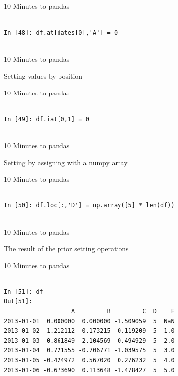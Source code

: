 \documentclass{beamer}
\begin{document}
\begin{frame}[t,fragile]{10 Minutes to pandas}


	\scriptsize
\begin{verbatim}

In [48]: df.at[dates[0],'A'] = 0


\end{verbatim}


\end{frame}


\begin{frame}[t]{10 Minutes to pandas}

Setting values by position

\end{frame}


\begin{frame}[t,fragile]{10 Minutes to pandas}


	\scriptsize
\begin{verbatim}

In [49]: df.iat[0,1] = 0


\end{verbatim}


\end{frame}


\begin{frame}[t]{10 Minutes to pandas}

Setting by assigning with a numpy array

\end{frame}


\begin{frame}[t,fragile]{10 Minutes to pandas}


	\scriptsize
\begin{verbatim}

In [50]: df.loc[:,'D'] = np.array([5] * len(df))


\end{verbatim}


\end{frame}


\begin{frame}[t]{10 Minutes to pandas}

The result of the prior setting operations

\end{frame}


\begin{frame}[t,fragile]{10 Minutes to pandas}


	\scriptsize
\begin{verbatim}

In [51]: df
Out[51]: 
                   A         B         C  D    F
2013-01-01  0.000000  0.000000 -1.509059  5  NaN
2013-01-02  1.212112 -0.173215  0.119209  5  1.0
2013-01-03 -0.861849 -2.104569 -0.494929  5  2.0
2013-01-04  0.721555 -0.706771 -1.039575  5  3.0
2013-01-05 -0.424972  0.567020  0.276232  5  4.0
2013-01-06 -0.673690  0.113648 -1.478427  5  5.0


\end{verbatim}


\end{frame}
\end{document}
